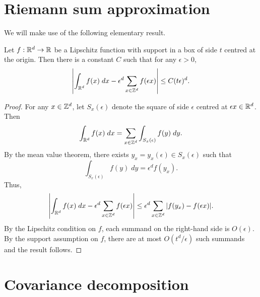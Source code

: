 
\section{Riemann sum approximation}

We will make use of the following elementary result.

\begin{lemma}
Let $f : { {{\mathbb R}}^d} \rightarrow {\mathbb R}$ be a Lipschitz function with support in a box of side $t$
centred at the origin.
Then there is a constant $C$ such that for any $\epsilon > 0$,
\begin{equation}
\left|\int_{ {{\mathbb R}}^d} f(x) \; dx - \epsilon^d \sum_{x\in{ {{\mathbb Z}}^d }} f(\epsilon x)\right|
	\le
C (t \epsilon)^d.
\end{equation}
\end{lemma}

\begin{proof}
For any $x\in{ {{\mathbb Z}}^d }$, let $S_x(\epsilon)$ denote the square of side $\epsilon$
centred at $\epsilon x\in{ {{\mathbb R}}^d}$. Then
\begin{equation}
\int_{{ {{\mathbb R}}^d}} f(x) \; dx
	=
\sum_{x\in{ {{\mathbb Z}}^d }} \int_{S_x(\epsilon)} f(y) \; dy.
\end{equation}
By the mean value theorem, there exists $y_x = y_x(\epsilon) \in S_x(\epsilon)$ such that
\begin{equation}
\int_{S_x(\epsilon)} f(y) \; dy
	=
\epsilon^d f(y_x).
\end{equation}
Thus,
\begin{equation}
\left|\int_{ {{\mathbb R}}^d} f(x) \; dx - \epsilon^d \sum_{x\in{ {{\mathbb Z}}^d }} f(\epsilon x)\right|
	\le
\epsilon^d \sum_{x\in{ {{\mathbb Z}}^d }} |f(y_x) - f(\epsilon x)|.
\end{equation}
By the Lipschitz condition on $f$, each summand on the right-hand side is
$O(\epsilon)$. By the support assumption on $f$, there are at most
$O(t^d/\epsilon)$ such summands and the result follows.
\end{proof}


\section{Covariance decomposition}

